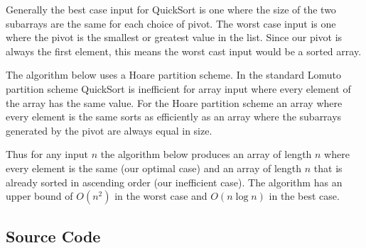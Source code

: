 \documentclass[11pt]{article}
\begin{document}
Generally the best case input for QuickSort is one where the size of the two subarrays are the same for each choice of pivot. The worst case input is one where the pivot is the smallest or greatest value in the list. Since our pivot is always the first element, this means the worst cast input would be a sorted array.

The algorithm below uses a Hoare partition scheme. In the standard Lomuto partition scheme QuickSort is inefficient for array input where every element of the array has the same value. For the Hoare partition scheme an array where every element is the same sorts as efficiently as an array where the subarrays generated by the pivot are always equal in size.

Thus for any input $n$ the algorithm below produces an array of length $n$ where every element is the same (our optimal case) and an array of length $n$ that is already sorted in ascending order (our inefficient case). The algorithm has an upper bound of $O(n^2)$ in the worst case and $O(n\log n)$ in the best case.

\subsection*{Source Code}
\end{document}
